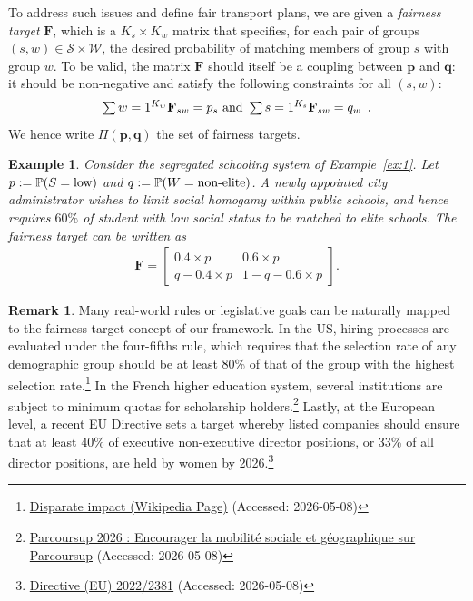 \documentclass{article}
\newtheorem{ex}[thm]{Example}
\theoremstyle{definition}
\newtheorem{remark}[theorem]{Remark}
\begin{document}
To address such issues and define fair transport plans, we are given a \emph{fairness target} $\mathbf{F}$, which is a $K_s \times K_w$ matrix that specifies, for each pair of groups $(s,w) \in \mathcal{S}\times \mathcal{W}$, the desired probability of matching members of group $s$ with group $w$. To be valid, the matrix $\mathbf{F}$ should itself be a coupling between $\mathbf{p}$ and $\mathbf{q}$: it should be non-negative and satisfy the following constraints for all $(s,w)$:
\begin{align*}
    \textstyle\sum{w=1}^{K_w}\mathbf{F}_{sw} = p_s \textnormal{ and } \sum{s=1}^{K_s}\mathbf{F}_{sw} = q_w\enspace.
\end{align*}
We hence write $\Pi(\mathbf{p},\mathbf{q})$ the set of fairness targets.
\begin{ex}
    \label{ex:2}
    Consider the segregated schooling system of Example~\ref{ex:1}. Let $p := \mathbb{P}(S=\textnormal{low})$ and  $q := \mathbb{P}(W=\textnormal{non-elite})$. A newly appointed city administrator wishes to limit social homogamy within public schools, and hence requires $60\%$ of student with low social status to be matched to elite schools. The fairness target can be written as
    \begin{align*}
        \mathbf{F} = \begin{bmatrix}
            0.4 \times p &  0.6 \times p\\
            q -  0.4 \times p & 1-q - 0.6 \times p 
        \end{bmatrix}.
    \end{align*}
\end{ex}
\begin{remark}
    Many real-world rules or legislative goals can be naturally mapped to the fairness target concept of our framework. In the US, hiring processes are evaluated under the four-fifths rule, which requires that the selection rate of any demographic group should be at least 80\% of that of the group with the highest selection rate.\footnote{{\href{https://en.wikipedia.org/wiki/Disparate_impact}{Disparate impact (Wikipedia Page)} (Accessed: 2026-05-08)}}
    In the French higher education system, several institutions are subject to minimum quotas for scholarship holders.\footnote{{\href{https://draaf.hauts-de-france.agriculture.gouv.fr/parcoursup-2025-encourager-la-mobilite-sociale-et-geographique-sur-parcoursup-a3979.html}{Parcoursup 2026 : Encourager la mobilité sociale et géographique sur Parcoursup}} (Accessed: 2026-05-08)} 
    Lastly, at the European level, a recent EU Directive sets a target whereby listed companies should ensure that at least 40\% of executive non-executive director positions, or 33\% of all director positions, are held by women by 2026.\footnote{\href{https://eur-lex.europa.eu/eli/dir/2022/2381/oj/eng}{Directive (EU) 2022/2381} (Accessed: 2026-05-08)} 
\end{remark}
\end{document}

